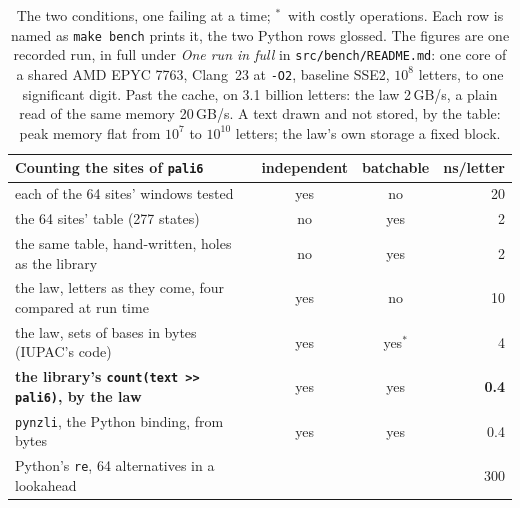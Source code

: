 \begin{table}[htbp]
\centering
\small
\begin{tabularx}{\linewidth}{@{}>{\raggedright\arraybackslash}X ccr@{}}
\toprule
Counting the sites of \texttt{pali6} & independent & batchable & ns/letter \\
\midrule
each of the 64 sites' windows tested & yes & no & 20 \\
the 64 sites' table (277 states) & no & yes & 2 \\
\quad the same table, hand-written, holes as the library & no & yes & 2 \\
the law, letters as they come, four compared at run time & yes & no & 10 \\
the law, sets of bases in bytes (IUPAC's code) & yes & yes$^{\ast}$ & 4 \\
\textbf{the library's \texttt{count(text >> pali6)}, by the law} & yes & yes & \textbf{0.4} \\
\quad \texttt{pynzli}, the Python binding, from bytes & yes & yes & 0.4 \\
Python's \texttt{re}, 64 alternatives in a lookahead & & & 300 \\
\bottomrule
\end{tabularx}
\caption{The two conditions, one failing at a time; $^{\ast}$~with costly operations.
Each row is named as \texttt{make bench} prints it, the two Python rows glossed.
The figures are one recorded run, in full under \emph{One run in full} in \texttt{src/bench/README.md}: one core of a shared AMD EPYC 7763, Clang~23 at \texttt{-O2}, baseline SSE2, $10^8$ letters, to one significant digit.
Past the cache, on 3.1 billion letters: the law 2\,GB/s, a plain read of the same memory 20\,GB/s.
A text drawn and not stored, by the table: peak memory flat from $10^7$ to $10^{10}$ letters; the law's own storage a fixed block.}
\label{tab:batch}
\end{table}
